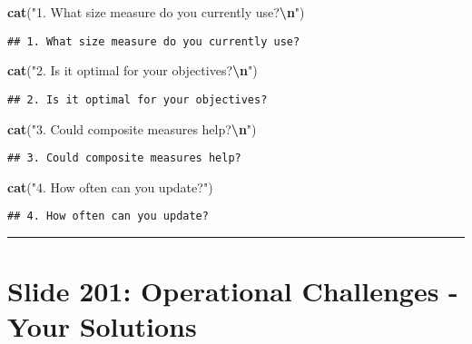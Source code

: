 \documentclass[
]{article}
\newenvironment{Shaded}{\begin{snugshade}}{\end{snugshade}}
\newcommand{\FunctionTok}[1]{\textcolor[rgb]{0.13,0.29,0.53}{\textbf{#1}}}
\newcommand{\NormalTok}[1]{#1}
\newcommand{\SpecialCharTok}[1]{\textcolor[rgb]{0.81,0.36,0.00}{\textbf{#1}}}
\newcommand{\StringTok}[1]{\textcolor[rgb]{0.31,0.60,0.02}{#1}}
\begin{document}
\begin{Shaded}
\begin{Highlighting}[]
\FunctionTok{cat}\NormalTok{(}\StringTok{"1. What size measure do you currently use?}\SpecialCharTok{\textbackslash{}n}\StringTok{"}\NormalTok{)}
\end{Highlighting}
\end{Shaded}

\begin{verbatim}
## 1. What size measure do you currently use?
\end{verbatim}

\begin{Shaded}
\begin{Highlighting}[]
\FunctionTok{cat}\NormalTok{(}\StringTok{"2. Is it optimal for your objectives?}\SpecialCharTok{\textbackslash{}n}\StringTok{"}\NormalTok{)}
\end{Highlighting}
\end{Shaded}

\begin{verbatim}
## 2. Is it optimal for your objectives?
\end{verbatim}

\begin{Shaded}
\begin{Highlighting}[]
\FunctionTok{cat}\NormalTok{(}\StringTok{"3. Could composite measures help?}\SpecialCharTok{\textbackslash{}n}\StringTok{"}\NormalTok{)}
\end{Highlighting}
\end{Shaded}

\begin{verbatim}
## 3. Could composite measures help?
\end{verbatim}

\begin{Shaded}
\begin{Highlighting}[]
\FunctionTok{cat}\NormalTok{(}\StringTok{"4. How often can you update?"}\NormalTok{)}
\end{Highlighting}
\end{Shaded}

\begin{verbatim}
## 4. How often can you update?
\end{verbatim}

\begin{center}\rule{0.5\linewidth}{0.5pt}\end{center}

\section{Slide 201: Operational Challenges - Your
Solutions}\label{slide-201-operational-challenges---your-solutions}
\end{document}
